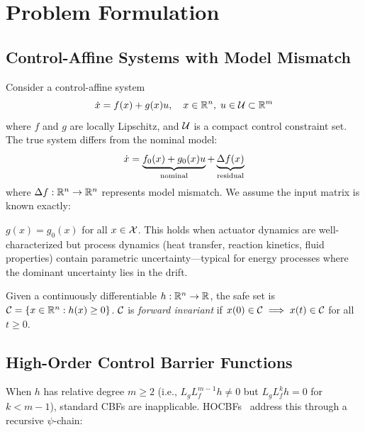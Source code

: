 \section{Problem Formulation}
\label{sec:problem}

\subsection{Control-Affine Systems with Model Mismatch}

Consider a control-affine system
\begin{equation}
    \dot{x} = f(x) + g(x)u, \quad x \in \mathbb{R}^n, \; u \in \mathcal{U} \subset \mathbb{R}^m
    \label{eq:control_affine}
\end{equation}
where $f$ and $g$ are locally Lipschitz, and $\mathcal{U}$ is a compact control constraint set. The true system differs from the nominal model:
\begin{equation}
    \dot{x} = \underbrace{f_0(x) + g_0(x)u}_{\text{nominal}} + \underbrace{\Delta f(x)}_{\text{residual}}
    \label{eq:true_dynamics}
\end{equation}
where $\Delta f: \mathbb{R}^n \to \mathbb{R}^n$ represents model mismatch. We assume the input matrix is known exactly:

\begin{assumption}[$\Deltag = 0$]
\label{asm:delta_g}
$g(x) = g_0(x)$ for all $x \in \mathcal{X}$. This holds when actuator dynamics are well-characterized but process dynamics (heat transfer, reaction kinetics, fluid properties) contain parametric uncertainty---typical for energy processes where the dominant uncertainty lies in the drift.
\end{assumption}

\begin{definition}
\label{def:safe_set}
Given a continuously differentiable $h: \mathbb{R}^n \to \mathbb{R}$, the safe set is $\mathcal{C} = \{x \in \mathbb{R}^n : h(x) \geq 0\}$. $\mathcal{C}$ is \emph{forward invariant} if $x(0) \in \mathcal{C} \implies x(t) \in \mathcal{C}$ for all $t \geq 0$.
\end{definition}

\subsection{High-Order Control Barrier Functions}

When $h$ has relative degree $m \geq 2$ (i.e., $L_g L_f^{m-1} h \neq 0$ but $L_g L_f^{k} h = 0$ for $k < m-1$), standard CBFs are inapplicable. HOCBFs~\cite{xiao2021hocbf} address this through a recursive $\psi$-chain:

